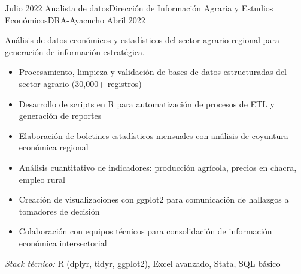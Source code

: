 \experience
{Julio 2022} {Analista de datos}{Dirección de Información Agraria y Estudios Económicos}{DRA-Ayacucho}
{Abril 2022} {
	Análisis de datos económicos y estadísticos del sector agrario regional para generación de información estratégica.
	\begin{itemize}
		\item Procesamiento, limpieza y validación de bases de datos estructuradas del sector agrario (30,000+ registros)
		\item Desarrollo de scripts en R para automatización de procesos de ETL y generación de reportes
		\item Elaboración de boletines estadísticos mensuales con análisis de coyuntura económica regional
		\item Análisis cuantitativo de indicadores: producción agrícola, precios en chacra, empleo rural
		\item Creación de visualizaciones con ggplot2 para comunicación de hallazgos a tomadores de decisión
		\item Colaboración con equipos técnicos para consolidación de información económica intersectorial
	\end{itemize}
}
{\footnotesize{\emph{Stack técnico:} R (dplyr, tidyr, ggplot2), Excel avanzado, Stata, SQL básico}}
